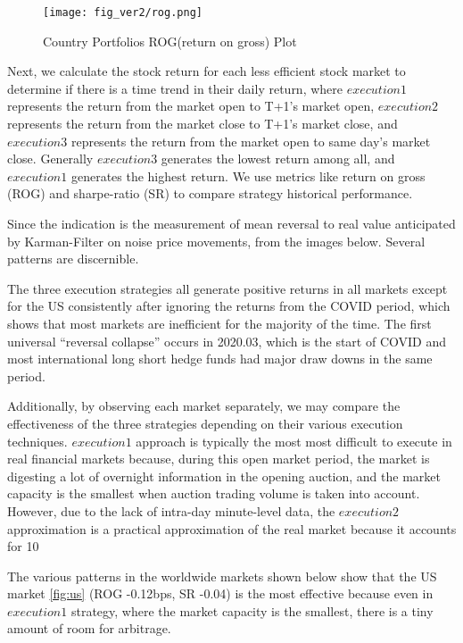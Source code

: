 \begin{figure}[h]
    \centering
    \texttt{[image: fig\_ver2/rog.png]}
    \caption{Country Portfolios ROG(return on gross) Plot}
    \label{fig:rog}
\end{figure}

Next, we calculate the stock return for each less efficient stock market to determine if there is a time trend in their daily return, where $execution1$ represents the return from the market open to T+1's market open, $execution2$ represents the return from the market close to T+1's market close, and $execution3$ represents the return from the market open to same day's market close. 
Generally $execution3$ generates the lowest return among all, and $execution1$ generates the highest return. We use metrics like return on gross (ROG) and sharpe-ratio (SR) to compare strategy historical performance.


Since the indication is the measurement of mean reversal to real value anticipated by Karman-Filter on noise price movements, from the images below. Several patterns are discernible.


The three execution strategies all generate positive returns in all markets except for the US consistently after ignoring the returns from the COVID period, which shows that most markets are inefficient for the majority of the time. The first universal ``reversal collapse'' occurs in 2020.03, which is the start of COVID and most international long short hedge funds had major draw downs in the same period.


Additionally, by observing each market separately, we may compare the effectiveness of the three strategies depending on their various execution techniques. $execution1$ approach is typically the most most difficult to execute in real financial markets because, during this open market period, the market is digesting a lot of overnight information in the opening auction, and the market capacity is the smallest when auction trading volume is taken into account. However, due to the lack of intra-day minute-level data, the $execution2$ approximation is a practical approximation of the real market because it accounts for 10\

The various patterns in the worldwide markets shown below show that the US market \ref{fig:us} (ROG -0.12bps, SR -0.04) is the most effective because even in $execution1$ strategy, where the market capacity is the smallest, there is a tiny amount of room for arbitrage. 

